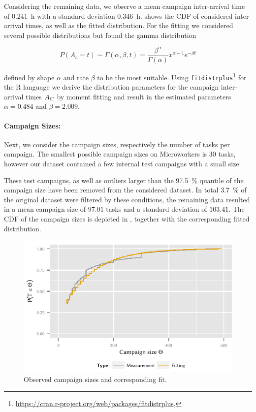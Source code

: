 Considering the remaining data, we observe a mean campaign inter-arrival time of \SI{0.241}{\hour} with a standard deviation \SI{0.346}{\hour}.
 shows the \gls{CDF} of considered inter-arrival times, as well as the fitted distribution.
For the fitting we considered several possible distributions but found the gamma distribution 

\[
P(A_c=t) \sim \Gamma(\alpha,\beta,t) = \frac{\beta^\alpha}{\Gamma(\alpha)} x^{\alpha-1} e^{-{\beta}t}
\]

defined by shape \(\alpha\) and rate \(\beta\) to be the most suitable.
Using \texttt{fitdistrplus}\footnote{\url{https://cran.r-project.org/web/packages/fitdistrplus}, \accessed} for the R language we derive the distribution parameters for the campaign inter-arrival times \(A_C\) by moment fitting and result in the estimated parameters \(\alpha=0.484\) and \(\beta=2.009\).

\paragraph*{Campaign Sizes:}Next, we consider the campaign sizes, respectively the number of tasks per campaign.
The smallest possible campaign sizes on Microworkers is \(30\) tasks, however our dataset contained a few internal test campaigns with a small size.

These test campaigns, as well as outliers larger than the \SI{97.5}{\percent} quantile of the campaign size have been removed from the considered dataset.
In total \SI{3.7}{\percent} of the original dataset were filtered by these conditions, the remaining data resulted in a mean campaign size of \(97.01\) tasks and a standard deviation of \(103.41\).
The \gls{CDF} of the campaign sizes \campaignSize is depicted in , together with the corresponding fitted distribution.

\begin{figure}
  \centering
  \includegraphics{cloud/crowdsourcing/measurements/figures/campaign_sizes}
  \caption{Observed campaign sizes \campaignSize and corresponding fit.}
  \label{fig:cloud:crowdsourcing:measurements:parameters:campaign_sizes}
\end{figure}

